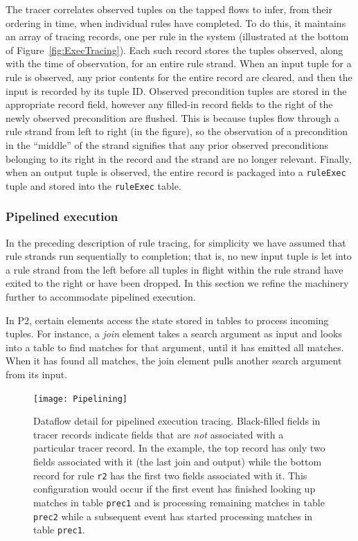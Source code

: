 \documentclass{sig-alt-full}
\def\Sys{P2\xspace}
\newcommand{\ol}[1]{{\tt\footnotesize#1}}
\begin{document}
The tracer correlates observed tuples on the tapped
flows to infer, from their ordering in time, when
individual rules have completed.  To do this, it
maintains an array of tracing records, one per rule in the
system (illustrated at the bottom of
Figure~\ref{fig:ExecTracing}). Each such record stores the tuples
observed, along with the time of observation, for an entire rule
strand.  When an input
tuple for a rule is observed, any prior contents for the entire record
are cleared, and then the input is recorded by its tuple ID.  Observed
precondition tuples are stored in the appropriate record field, however
any filled-in record fields to the right of the newly observed
precondition are flushed.  This is because tuples flow through a rule
strand from left to right (in the figure), so the observation of a
precondition in the ``middle'' of the strand signifies that any prior
observed preconditions belonging to its right in the record and the
strand are no longer relevant.  Finally, when an output tuple is
observed, the entire record is packaged into a \ol{ruleExec} tuple and
stored into the \ol{ruleExec} table.  

\subsubsection{Pipelined execution}
In the preceding description of rule tracing, for simplicity we have
assumed that
rule strands run sequentially to completion; that is, no new input tuple is
let into a rule strand from the left before all tuples in flight within
the rule strand have exited to the right or have been dropped. In this
section we refine the machinery further to accommodate pipelined
execution.

In \Sys, certain elements access the state stored in tables to process
incoming tuples.  For instance, a \emph{join} element takes a search
argument as input and looks into a table to find matches for that
argument, until it has emitted all matches.  When it has found all
matches, the join element pulls another search argument from its
input. 

\begin{figure}
\centerline{\texttt{[image: Pipelining]}}
\caption{Dataflow detail for pipelined execution tracing.  
  Black-filled fields in tracer records indicate fields that are
  \emph{not} associated with a particular tracer record. In the example,
  the top record has only two fields associated with it (the last join
  and output) while the bottom record for rule \ol{r2} has the first two
  fields associated with it. This configuration would occur if the first
  event has finished looking up matches in table \ol{prec1} and is
  processing remaining matches in table \ol{prec2} while a subsequent
  event has started processing matches in table \ol{prec1}.}
\label{fig:Pipelining}
\end{figure}
\end{document}
